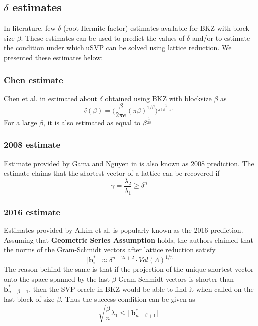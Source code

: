 \subsection{$\delta$ estimates}
In literature, few $\delta$ (root Hermite factor) estimates available for  BKZ with block size $\beta$.
These estimates can be used to predict the values of $\delta$ and/or to estimate the condition under which uSVP can be solved using lattice reduction.
We presented these estimates below:

\subsubsection{Chen estimate} Chen et al.
in \cite{chen2013reduction} estimated about $\delta$ obtained using BKZ with blocksize $\beta$ as
\begin{equation*}
    \delta(\beta)=\Big( \frac{\beta}{2\pi e} (\pi \beta)^{1/\beta} \Big) ^{\frac{1}{2(\beta-1)}}
\end{equation*}
For a large $\beta$, it is also estimated as equal to $\beta^{\frac{1}{2\beta}}$
\subsubsection{2008 estimate} Estimate provided by Gama and Nguyen in \cite{gama2008predicting} is also known as 2008 prediction.
The estimate claims that the shortest vector of a lattice can be recovered if
\begin{equation*}
    \gamma = \frac{\lambda_2}{\lambda_1} \geq \delta^n
\end{equation*}

\subsubsection{2016 estimate} Estimates provided by Alkim et al.
\cite{alkim2016post} is popularly known as the 2016 prediction.
Assuming that \textbf{Geometric Series Assumption} \cite{schnorr2003lattice} holds, the authors claimed that the norms of the Gram-Schmidt vectors after lattice reduction satisfy
\begin{equation*}
    ||\pmb{b}_i^*|| \approx \delta^{n-2i+2} \cdot Vol(\Lambda)^{1/n}
\end{equation*}
The reason behind the same is that if the projection of the unique shortest vector onto the space spanned by the last $\beta$ Gram-Schmidt vectors is shorter than $\pmb{b}_{n-\beta+1}^*$, then the SVP oracle in BKZ would be able to find it when called on the last block of size $\beta$.
Thus the success condition can be given as
\begin{equation*}
    \sqrt{\frac{\beta}{n}}\lambda_1 \leq ||\pmb{b}_{n-\beta+1}^*||
\end{equation*}



